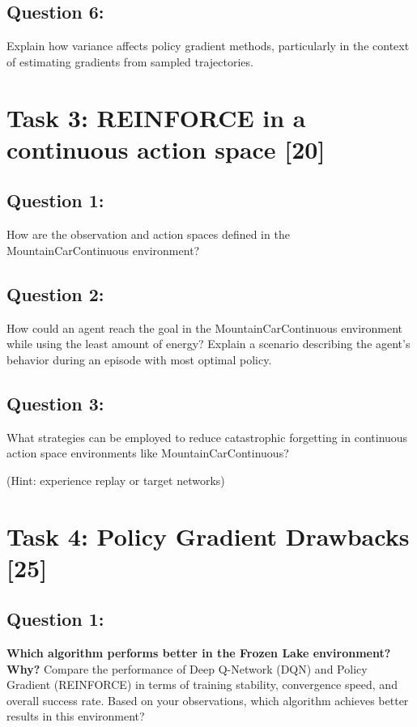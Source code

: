 \documentclass[12pt]{article}
\begin{document}
{{{\subsection{Question 6:}

Explain how variance affects policy gradient methods, particularly in the context of estimating gradients from sampled trajectories.

\newpage

\section{Task 3: REINFORCE in a continuous action space [20]}

\subsection{Question 1:}

How are the observation and action spaces defined in the MountainCarContinuous environment?
\vspace*{0.3cm}

\subsection{Question 2:}

How could an agent reach the goal in the MountainCarContinuous environment while using the least amount of energy? Explain a scenario describing the agent's behavior during an episode with most optimal policy.
\vspace*{0.3cm}

\subsection{Question 3:}

What strategies can be employed to reduce catastrophic forgetting in continuous action space environments like MountainCarContinuous?

(Hint: experience replay or target networks)
\vspace*{0.3cm}

\newpage

\section{Task 4: Policy Gradient Drawbacks [25]}

\subsection{Question 1:}
\textbf{Which algorithm performs better in the Frozen Lake environment? Why?}
\newline
Compare the performance of Deep Q-Network (DQN) and Policy Gradient (REINFORCE) in terms of training stability, convergence speed, and overall success rate. Based on your observations, which algorithm achieves better results in this environment?

}}}
\end{document}

